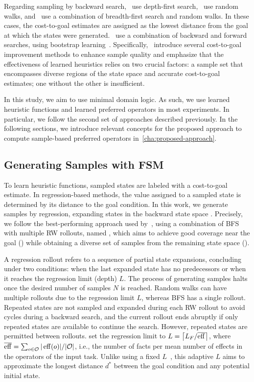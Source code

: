 \documentclass[ppgc,diss,english]{iiufrgs}
\providecommand{\ceil}[1]{\ensuremath{\left\lceil #1\right\rceil}}
\begin{document}
Regarding sampling by backward search,~\citet{Yu.etal/2020} use depth-first search,~\citet{OToole/2022} use random walks, and~\citet{Bettker.etal/2022} use a combination of breadth-first search and random walks. In these cases, the cost-to-goal estimates are assigned as the lowest distance from the goal at which the states were generated.~\citet{Ferber.etal/2022} use a combination of backward and forward searches, using bootstrap learning~\cite{Arfaee.etal/2011}.
Specifically,~\citet{Bettker.etal/2022} introduce several cost-to-goal improvement methods to enhance sample quality and emphasize that the effectiveness of learned heuristics relies on two crucial factors: a sample set that encompasses diverse regions of the state space and accurate cost-to-goal estimates; one without the other is insufficient.

In this study, we aim to use minimal domain logic. As such, we use learned heuristic functions and learned preferred operators in most experiments. In particular, we follow the second set of approaches described previously. In the following sections, we introduce relevant concepts for the proposed approach to compute sample-based preferred operators in~\cref{cha:proposed-approach}.


\subsection{Generating Samples with FSM}
\label{sec:sample-learn-h}
To learn heuristic functions, sampled states are labeled with a cost-to-goal estimate. In regression-based methods, the value assigned to a sampled state is determined by its distance to the goal condition. In this work, we generate samples by regression, expanding states in the backward state space \bsp. Precisely, we follow the best-performing approach used by~\citet{Bettker.etal/2022}, using a combination of BFS with multiple RW rollouts, named \bfsrw, which aims to achieve good coverage near the goal (\bfs) while obtaining a diverse set of samples from the remaining state space (\rw).

A regression rollout refers to a sequence of partial state expansions, concluding under two conditions: when the last expanded state has no predecessors or when it reaches the regression limit (depth) $L$. The process of generating samples halts once the desired number of samples $N$ is reached. Random walks can have multiple rollouts due to the regression limit $L$, whereas BFS has a single rollout. Repeated states are not sampled and expanded during each RW rollout to avoid cycles during a backward search, and the current rollout ends abruptly if only repeated states are available to continue the search. However, repeated states are permitted between rollouts.
\citet{Bettker.etal/2022} set the regression limit to $L=\ceil{\facts/\overline{\eff}}$, where $\overline{\operatorname{eff}}=\sum_{o\in \mathcal{O}} |\operatorname{eff}(o)|/|\mathcal{O}|$, i.e., the number of facts per mean number of effects in the operators of the input task. Unlike using a fixed $L$~\cite{Yu.etal/2020, OToole/2022}, this adaptive $L$ aims to approximate the longest distance $d^{*}$ between the goal condition and any potential initial state.
\end{document}
